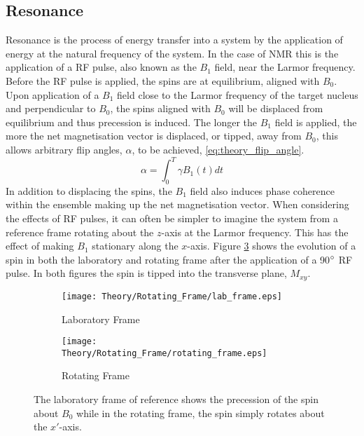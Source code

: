 \subsection{Resonance}

Resonance is the process of energy transfer into a system by the application of energy at the natural frequency of the system. In the case of \ac{NMR} this is the application of a \ac{RF} pulse, also known as the $B_1$ field, near the Larmor frequency. Before the \ac{RF} pulse is applied, the spins are at equilibrium, aligned with $B_0$. Upon application of a $B_1$ field close to the Larmor frequency of the target nucleus and perpendicular to $B_0$, the spins aligned with $B_0$ will be displaced from equilibrium and thus precession is induced. The longer the $B_1$ field is applied, the more the net magnetisation vector is displaced, or tipped, away from $B_0$, this allows arbitrary flip angles, $\alpha$, to be achieved, \eqref{eq:theory_flip_angle}. 
\begin{equation}
\alpha = \int_{0}^{T} \gamma B_1\left(t\right) dt
\label{eq:theory_flip_angle}
\end{equation}
In addition to displacing the spins, the $B_1$ field also induces phase coherence within the ensemble making up the net magnetisation vector. When considering the effects of \ac{RF} pulses, it can often be simpler to imagine the system from a reference frame rotating about the $z$-axis at the Larmor frequency. This has the effect of making $B_1$ stationary along the $x$-axis. Figure \ref{fig:theory_reference_frames} shows the evolution of a spin in both the laboratory and rotating frame after the application of a 90$\degree$  \ac{RF} pulse. In both figures the spin is tipped into the transverse plane, $M_{xy}$.

\begin{figure}[H]
	\centering
	\begin{subfigure}[c]{0.47\textwidth}
		\centering
		\texttt{[image: Theory/Rotating\_Frame/lab\_frame.eps]}
		\caption{Laboratory Frame}
		\label{fig:thoery_lab_frame}
	\end{subfigure}
	\hfill
	\begin{subfigure}[c]{0.47\textwidth}
		\centering
		\texttt{[image: Theory/Rotating\_Frame/rotating\_frame.eps]}
		\caption{Rotating Frame}
		\label{fig:theory_rotating_frame}
	\end{subfigure}
	\caption{The laboratory frame of reference shows the precession of the spin about $B_0$ while in the rotating frame, the spin simply rotates about the $x'$-axis.}
	\label{fig:theory_reference_frames}
\end{figure}

